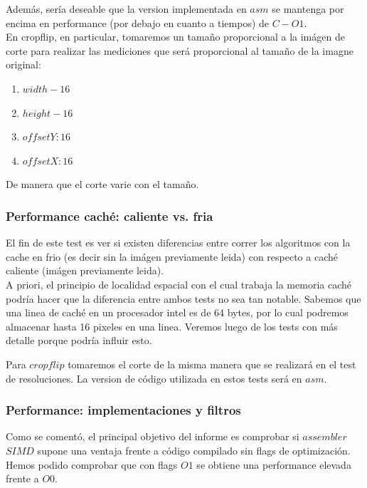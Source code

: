 Además, sería deseable que la version implementada en $asm$ se mantenga por encima en performance (por debajo en cuanto a tiempos) de $C-O1$. \\ 
En cropflip, en particular, tomaremos un tamaño proporcional a la imágen de corte para realizar las mediciones que será proporcional al tamaño de la imagne original: \\

\begin{enumerate}
\item $width-16$ 
\item $height-16$
\item $offsetY: 16$
\item $offsetX: 16$
\end{enumerate}

De manera que el corte varie con el tamaño. 

\subsubsection{Performance caché: caliente vs. fria}

El fin de este test es ver si existen diferencias entre correr los algoritmos con la cache en frio (es decir sin la imágen previamente leida) con respecto a caché caliente (imágen previamente leida). \\

A priori, el principio de localidad espacial con el cual trabaja la memoria caché podría hacer que la diferencia entre ambos tests no sea tan notable. 
Sabemos que una linea de caché en un procesador intel es de 64 bytes, por lo cual podremos almacenar hasta 16 pixeles en una linea. Veremos luego de los tests con más detalle porque podría influir esto.

Para $cropflip$ tomaremos el corte de la misma manera que se realizará en el test de resoluciones.
La version de código utilizada en estos tests será en $asm$.

\subsubsection{Performance: implementaciones y filtros}

Como se comentó, el principal objetivo del informe es comprobar si $assembler$ $SIMD$ supone una ventaja frente a código compilado sin flags de optimización. 
Hemos podido comprobar que con flags $O1$ se obtiene una performance elevada frente a $O0$.\\

